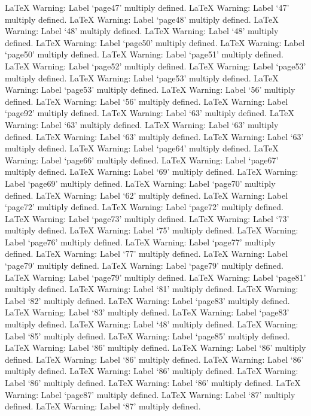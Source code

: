 LaTeX Warning: Label `page47' multiply defined.
LaTeX Warning: Label `47' multiply defined.
LaTeX Warning: Label `page48' multiply defined.
LaTeX Warning: Label `48' multiply defined.
LaTeX Warning: Label `48' multiply defined.
LaTeX Warning: Label `page50' multiply defined.
LaTeX Warning: Label `page50' multiply defined.
LaTeX Warning: Label `page51' multiply defined.
LaTeX Warning: Label `page52' multiply defined.
LaTeX Warning: Label `page53' multiply defined.
LaTeX Warning: Label `page53' multiply defined.
LaTeX Warning: Label `page53' multiply defined.
LaTeX Warning: Label `56' multiply defined.
LaTeX Warning: Label `56' multiply defined.
LaTeX Warning: Label `page92' multiply defined.
LaTeX Warning: Label `63' multiply defined.
LaTeX Warning: Label `63' multiply defined.
LaTeX Warning: Label `63' multiply defined.
LaTeX Warning: Label `63' multiply defined.
LaTeX Warning: Label `63' multiply defined.
LaTeX Warning: Label `page64' multiply defined.
LaTeX Warning: Label `page66' multiply defined.
LaTeX Warning: Label `page67' multiply defined.
LaTeX Warning: Label `69' multiply defined.
LaTeX Warning: Label `page69' multiply defined.
LaTeX Warning: Label `page70' multiply defined.
LaTeX Warning: Label `62' multiply defined.
LaTeX Warning: Label `page72' multiply defined.
LaTeX Warning: Label `page72' multiply defined.
LaTeX Warning: Label `page73' multiply defined.
LaTeX Warning: Label `73' multiply defined.
LaTeX Warning: Label `75' multiply defined.
LaTeX Warning: Label `page76' multiply defined.
LaTeX Warning: Label `page77' multiply defined.
LaTeX Warning: Label `77' multiply defined.
LaTeX Warning: Label `page79' multiply defined.
LaTeX Warning: Label `page79' multiply defined.
LaTeX Warning: Label `page79' multiply defined.
LaTeX Warning: Label `page81' multiply defined.
LaTeX Warning: Label `81' multiply defined.
LaTeX Warning: Label `82' multiply defined.
LaTeX Warning: Label `page83' multiply defined.
LaTeX Warning: Label `83' multiply defined.
LaTeX Warning: Label `page83' multiply defined.
LaTeX Warning: Label `48' multiply defined.
LaTeX Warning: Label `85' multiply defined.
LaTeX Warning: Label `page85' multiply defined.
LaTeX Warning: Label `86' multiply defined.
LaTeX Warning: Label `86' multiply defined.
LaTeX Warning: Label `86' multiply defined.
LaTeX Warning: Label `86' multiply defined.
LaTeX Warning: Label `86' multiply defined.
LaTeX Warning: Label `86' multiply defined.
LaTeX Warning: Label `86' multiply defined.
LaTeX Warning: Label `page87' multiply defined.
LaTeX Warning: Label `87' multiply defined.
LaTeX Warning: Label `87' multiply defined.
